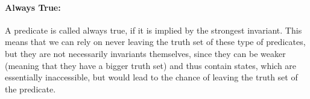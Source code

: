 \paragraph{Always True:}
A predicate is called always true, if it is implied by the strongest invariant. This means that we can rely on never leaving the truth set of these type of predicates, but they are not necessarily invariants themselves, since they can be weaker (meaning that they have a bigger truth set) and thus contain states, which are essentially inaccessible, but would lead to the chance of leaving the truth set of the predicate.
\begin{code}
    \>[2]\AgdaSpace{}%
    \AgdaSymbol{:}\AgdaSpace{}%
    \AgdaSpace{}%
    \AgdaSpace{}%
    \AgdaSpace{}%
    \AgdaSpace{}%
    \AgdaSpace{}%
    \AgdaSpace{}%
    \<%
    \\
    \>[2]\AgdaSpace{}%
    \AgdaSpace{}%
    \AgdaSpace{}%
    \AgdaSpace{}%
    \AgdaSymbol{=}\AgdaSpace{}%
    \AgdaSpace{}%
    \AgdaSpace{}%
    \AgdaSpace{}%
    \AgdaSpace{}%
    \AgdaSpace{}%
    \AgdaSpace{}%
    \<%
    \\
    \\[\AgdaEmptyExtraSkip]%
    \>[2]\AgdaSpace{}%
    \AgdaSpace{}%
    \<%
    \\
    \>[2]\AgdaSpace{}%
    \AgdaSymbol{:}\AgdaSpace{}%
    \AgdaSpace{}%
    \AgdaSpace{}%
    \AgdaSpace{}%
    \AgdaSpace{}%
    \AgdaSpace{}%
    \AgdaSpace{}%
    \<%
    \\
    \>[2]\AgdaSpace{}%
    \AgdaOperator{\AgdaFunction{∈true[}}\AgdaSpace{}%
    \AgdaSpace{}%
    \AgdaOperator{\AgdaFunction{/}}\AgdaSpace{}%
    \AgdaSpace{}%
    \AgdaOperator{\AgdaFunction{]}}\AgdaSpace{}%
    \AgdaSymbol{=}\AgdaSpace{}%
    \AgdaSpace{}%
    \AgdaSpace{}%
    \AgdaSpace{}%
    \<%
\end{code}

